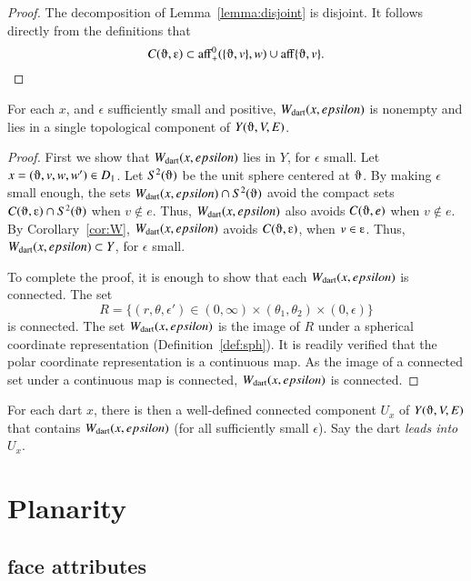 \begin{proof} The decomposition of Lemma~\ref{lemma:disjoint} is
disjoint.  It follows directly from the definitions that
   $$C(\orgn,\e)\subset \op{aff}_+^0(\{\orgn,v\},w) \cup 
    \op{aff}\{\orgn,v\}.$$
\end{proof}

\begin{lemma} 
For each $x$, and $\epsilon$ sufficiently small and positive,
$W_{\text{dart}}(x,epsilon)$ is nonempty and lies in a single 
topological component of $Y(\orgn,V,E)$.
\end{lemma}

\begin{proof}  First we show that $W_{\text{dart}}(x,epsilon)$ lies in $Y$,
for $\epsilon$ small.  Let $x=(\orgn,v,w,w')\in D_1$.  
Let $S^2(\orgn)$ be the unit sphere centered at $\orgn$.
By making $\epsilon$ small enough,
the sets $\Wdart(x,\epsilon)\cap S^2(\orgn)$
avoid the compact sets $C(\orgn,\e)\cap S^2(\orgn)$ when $v\not\in e$.
Thus, $W_{\text{dart}}(x,epsilon)$ also avoids $C(\orgn,e)$ when $v\not\in e$.
By Corollary~\ref{cor:W}, $W_{\text{dart}}(x,epsilon)$ avoids $C(\orgn,\e)$, when $v\in \e$.
Thus, $W_{\text{dart}}(x,epsilon)\subset Y$, for $\epsilon$ small.

To complete the proof, it is enough to show that each $W_{\text{dart}}(x,epsilon)$ is
connected.  
The  set
   $$
   R=\{(r,\theta,\epsilon') \in (0,\infty) \times (\theta_1,\theta_2) \times (0,\epsilon)\}
   $$
is connected.
The set $W_{\text{dart}}(x,epsilon)$  is the image of $R$
under a spherical coordinate representation (Definition~\ref{def:sph}).
It is readily verified that the polar coordinate representation is
a continuous map. As the image of a connected set under a continuous map
is connected, $W_{\text{dart}}(x,epsilon)$ is connected.
\end{proof}

\begin{definition} For each dart $x$, 
there is then a well-defined connected
component $U_x$ of $Y(\orgn,V,E)$ 
that contains $W_{\text{dart}}(x,epsilon)$ (for all
sufficiently small $\epsilon$). Say the dart {\it leads into}
$U_x$.
\end{definition}


\section{Planarity}


\subsection{face attributes}


